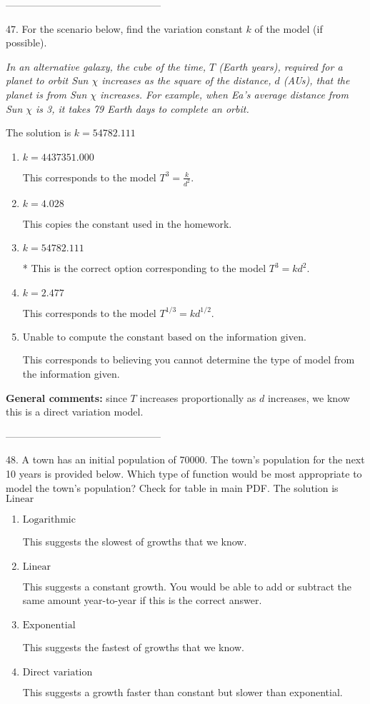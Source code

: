 \documentclass{article}[14pt]
\begin{document}
-----------------------------------------------

47. For the scenario below, find the variation constant $k$ of the model (if possible).
\begin{center} \textit{In an alternative galaxy, the cube of the time, $T$ (Earth years), required for a planet to orbit Sun $\chi$ increases as the square of the distance, $d$ (AUs), that the planet is from Sun $\chi$ increases. For example, when Ea's average distance from Sun $\chi$ is 3, it takes 79 Earth days to complete an orbit.} \end{center} 
The solution is $ k = 54782.111 $ 

\begin{enumerate}[label=\Alph*.] 
\item $ k = 4437351.000 $ 

 This corresponds to the model $T^{3} = \frac{k}{d^{2}}$. 
\item $ k = 4.028 $ 

 This copies the constant used in the homework. 
\item $ k = 54782.111 $ 

 * This is the correct option corresponding to the model $T^{3} = k d^{2}$. 
\item $ k = 2.477 $ 

 This corresponds to the model $T^{1/3} = k d^{1/2}$. 
\item $ \text{Unable to compute the constant based on the information given.} $ 

 This corresponds to believing you cannot determine the type of model from the information given. 
\end{enumerate} 
 
\textbf{General comments:} since $T$ increases proportionally as $d$ increases, we know this is a direct variation model.

-----------------------------------------------

48. A town has an initial population of 70000. The town's population for the next 10 years is provided below. Which type of function would be most appropriate to model the town's population?
Check for table in main PDF. 
The solution is $ \text{Linear} $ 

\begin{enumerate}[label=\Alph*.] 
\item $ \text{Logarithmic} $ 

 This suggests the slowest of growths that we know. 
\item $ \text{Linear} $ 

 This suggests a constant growth. You would be able to add or subtract the same amount year-to-year if this is the correct answer. 
\item $ \text{Exponential} $ 

 This suggests the fastest of growths that we know. 
\item $ \text{Direct variation} $ 

 This suggests a growth faster than constant but slower than exponential. 
\end{enumerate} 
 
\end{document}
